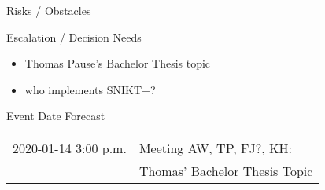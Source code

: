 \documentclass[]{kiesgrube}
\begin{document}
\begin{poster}
\begin{posterbox}[name=risks,column=1,below=open]{Risks / Obstacles}
\end{posterbox}
\begin{posterbox}[name=escalation,column=1,below=risks]{Escalation / Decision Needs}
\footnotesize
\begin{itemize}
\item Thomas Pause's Bachelor Thesis topic
\item who implements SNIKT+?
\end{itemize}
\end{posterbox}
\begin{posterbox}[name=event,column=0,below=progress]{Event Date Forecast}
\small
\begin{tabulary}{\textwidth}{lL}
2020-01-14 3:00 p.m.	&Meeting AW, TP, FJ?, KH:\\
			&Thomas' Bachelor Thesis Topic\\
\end{tabulary}
\end{posterbox}


\end{poster}
\end{document}
